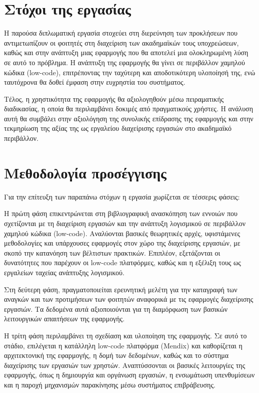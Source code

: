 	\section{Στόχοι της εργασίας}
		Η παρούσα διπλωματική εργασία στοχεύει στη διερεύνηση των προκλήσεων που αντιμετωπίζουν οι φοιτητές στη διαχείριση των ακαδημαϊκών τους υποχρεώσεων, καθώς και στην ανάπτυξη μιας εφαρμογής που θα αποτελεί μια ολοκληρωμένη λύση σε αυτό το πρόβλημα. Η ανάπτυξη της εφαρμογής θα γίνει σε περιβάλλον χαμηλού κώδικα (low-code), επιτρέποντας την ταχύτερη και αποδοτικότερη υλοποίησή της, ενώ ταυτόχρονα θα δοθεί έμφαση στην ευχρηστία του συστήματος.

		Τέλος, η χρηστικότητα της εφαρμογής θα αξιολογηθούν μέσω πειραματικής διαδικασίας, η οποία θα περιλαμβάνει δοκιμές από πραγματικούς χρήστες. Η ανάλυση αυτή θα συμβάλει στην αξιολόγηση της συνολικής επίδρασης της εφαρμογής και στην τεκμηρίωση της αξίας της ως εργαλείου διαχείρισης εργασιών στο ακαδημαϊκό περιβάλλον.


	\section{Μεθοδολογία προσέγγισης}
		Για την επίτευξη των παραπάνω στόχων η εργασία χωρίζεται σε τέσσερις φάσεις:

		Η πρώτη φάση επικεντρώνεται στη βιβλιογραφική ανασκόπηση των εννοιών που σχετίζονται με τη διαχείριση εργασιών και την ανάπτυξη λογισμικού σε περιβάλλον χαμηλού κώδικα (low-code). Αναλύονται βασικές θεωρητικές αρχές, υφιστάμενες μεθοδολογίες και υπάρχουσες εφαρμογές στον χώρο της διαχείρισης εργασιών, με σκοπό την κατανόηση των βέλτιστων πρακτικών. Επιπλέον, εξετάζονται οι δυνατότητες που παρέχουν οι low-code πλατφόρμες, καθώς και η εξέλιξη τους ως εργαλείων ταχείας ανάπτυξης λογισμικού.

		Στη δεύτερη φάση, πραγματοποιείται ερευνητική μελέτη για την καταγραφή των αναγκών και των προτιμήσεων των φοιτητών αναφορικά με τις εφαρμογές διαχείρισης εργασιών. Τα δεδομένα αυτά αξιοποιούνται για τη διαμόρφωση των βασικών λειτουργικών απαιτήσεων της εφαρμογής.

		Η τρίτη φάση περιλαμβάνει τη σχεδίαση και υλοποίηση της εφαρμογής. Σε αυτό το στάδιο, επιλέγεται η κατάλληλη low-code πλατφόρμα (Mendix) και καθορίζεται η αρχιτεκτονική της εφαρμογής, η δομή των δεδομένων, καθώς και το σύστημα διαχείρισης των εργασιών των χρηστών. Αναπτύσσονται οι βασικές λειτουργίες της εφαρμογής, όπως η δημιουργία και οργάνωση εργασιών, η ενσωμάτωση υπενθυμίσεων και η παροχή μηχανισμών παρακίνησης μέσω συστήματος επιβράβευσης.


